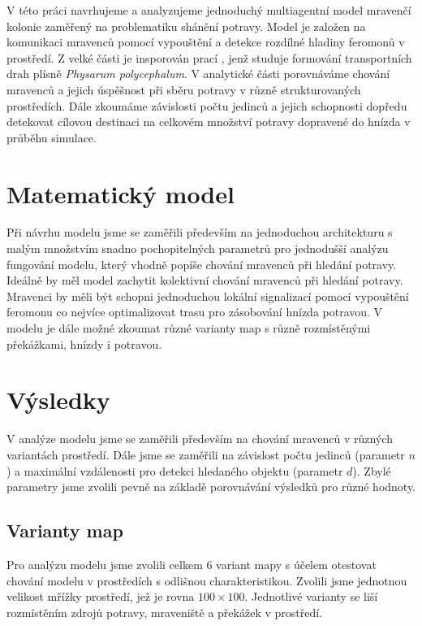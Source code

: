 \documentclass[10pt,a4paper,twocolumn]{article}
\begin{document}
V této práci navrhujeme a analyzujeme jednoduchý multiagentní model mravenčí 
kolonie zaměřený na problematiku shánění potravy. Model je založen na komunikaci
mravenců pomocí vypouštění a detekce rozdílné hladiny feromonů v prostředí.
Z velké části je insporován prací \citet{jones2010characteristics}, jenž studuje
formování transportních drah plísně \emph{Physarum polycephalum}. V analytické části
porovnáváme chování mravenců a jejich úspěšnost při sběru potravy v různě 
strukturovaných prostředích. Dále zkoumáme závislosti počtu jedinců a jejich 
schopnosti dopředu detekovat cílovou destinaci na celkovém množství potravy 
dopravené do hnízda v průběhu simulace. 


\section*{Matematický model}
Při návrhu modelu jsme se zaměřili především na jednoduchou architekturu s
malým množstvím snadno pochopitelných parametrů pro jednodušší analýzu 
fungování modelu, který vhodně popíše chování mravenců při hledání potravy.
Ideálně by měl model zachytit kolektivní chování mravenců při hledání potravy.
Mravenci by měli být schopni jednoduchou lokální signalizací pomocí
vypouštění feromonu co nejvíce optimalizovat trasu pro zásobování hnízda
potravou. V modelu je dále možné zkoumat různé varianty map s různě 
rozmístěnými překážkami, hnízdy i potravou.

\section*{Výsledky}

V analýze modelu jsme se zaměřili především na chování mravenců v různých
variantách prostředí. Dále jsme se zaměřili na závislost počtu
jedinců (parametr $n$) a maximální vzdálenosti pro detekci hledaného 
objektu (parametr $d$). Zbylé parametry jsme zvolili pevně na základě
porovnávání výsledků pro různé hodnoty. 

\subsection*{Varianty map}
Pro analýzu modelu jsme zvolili celkem 6 variant mapy s účelem otestovat
chování modelu v prostředích s odlišnou charakteristikou. Zvolili jsme 
jednotnou velikost mřížky prostředí, jež je rovna $100 \times 100$.
Jednotlivé varianty se liší rozmístěním zdrojů potravy, mraveniště a překážek
v prostředí.
\end{document}
